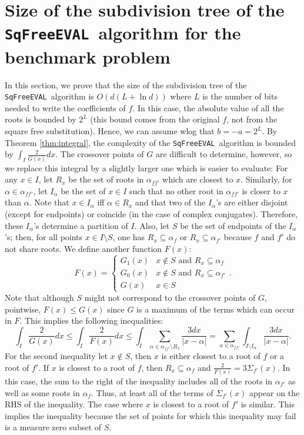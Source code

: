 \documentclass{amsart}
\theoremstyle{definition}
\newcommand{\EVAL}{\texttt{SqFreeEVAL}}
\begin{document}
\section{Size of the subdivision tree of the \EVAL\ algorithm for the benchmark problem}\label{Sec:Analysis}
In this section, we prove that the size of the subdivision tree of the \EVAL\ algorithm is $O(d(L+\ln d))$ where $L$ is the number of bits needed to write the coefficients of $f$.  In this case, the absolute value of all the roots is bounded by $2^L$ \citep{yap:algebra:bk} (this bound comes from the original $f$, not from the square free substitution).  Hence, we can assume wlog that $b=-a=2^L$.  By Theorem \ref{thm:integral}, the complexity of the \EVAL\ algorithm is bounded by $\int_I\frac{2}{G(x)}dx$.  The crossover points of $G$ are difficult to determine, however, so we replace this integral by a slightly larger one which is easier to evaluate: For any $x\in I$, let $R_x$ be the set of roots in $\alpha_{f\! f'}$ which are closest to $x$.  Similarly, for $\alpha\in \alpha_{f\! f'}$, let $I_\alpha$ be the set of $x\in I$ such that no other root in $\alpha_{f\! f'}$ is closer to $x$ than $\alpha$.  Note that $x\in I_\alpha$ iff $\alpha\in R_x$ and that two of the $I_\alpha$'s are either disjoint (except for endpoints) or coincide (in the case of complex conjugates).  Therefore, these $I_\alpha$'s determine a partition of $I$.  Also, let $S$ be the set of endpoints of the $I_\alpha$'s; then, for all points $x\in I\setminus S$, one has $R_x\subseteq\alpha_f$ or $R_x\subseteq\alpha_{f'}$ because $f$ and $f'$ do not share roots.  We define another function $F(x)$:
$$F(x)=\begin{cases}G_1(x)&x\not\in S\text{ and }R_x\subseteq\alpha_f\\
G_0(x)&x\not\in S\text{ and }R_x\subseteq\alpha_{f'}\\
G(x)&x\in S\end{cases}.$$
Note that although $S$ might not correspond to the crossover points of $G$, pointwise, $F(x)\leq G(x)$ since $G$ is a maximum of the terms which can occur in $F$.  This implies the following inequalities:
\begin{equation}\label{eq:evaluated}
\int_I\frac{2}{G(x)}dx\leq\int_I\frac{2}{F(x)}dx\leq \int_I\sum_{\alpha\in \alpha_{f\! f'}\setminus R_x}\frac{3dx}{|x-\alpha|}=\sum_{\alpha\in \alpha_{f\! f'}}\int_{I\setminus I_{\alpha}}\frac{3dx}{|x-\alpha|}.
\end{equation}
For the second inequality let $x\not\in S$, then $x$ is either closest to a root of $f$ or a root of $f'$. If $x$ is closest to a root of $f$, then $R_x\subseteq\alpha_f$ and $\frac{2}{F(x)}=3\Sigma_{f'}(x)$.  In this case, the sum to the right of the inequality includes all of the roots in $\alpha_{f'}$ as well as some roots in $\alpha_f$.  Thus, at least all of the terms of $\Sigma_{f'}(x)$ appear on the RHS of the inequality.  The case where $x$ is closest to a root of $f'$ is similar.  This implies the inequality because the set of points for which this inequality may fail is a measure zero subset of $S$.
\end{document}
